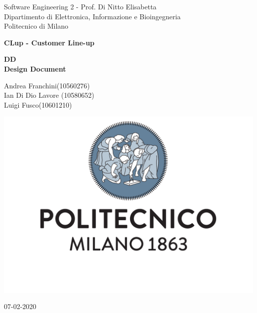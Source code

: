 \documentclass[a4paper]{article}
\begin{document}
\begin{titlepage}
	\centering
    
    {\normalsize 
        Software Engineering 2 - Prof. Di Nitto Elisabetta \\ 
		Dipartimento di Elettronica, Informazione e Bioingegneria \\
        Politecnico di Milano \par
    }     \vspace{3cm}

    {\Huge \textbf{CLup - Customer Line-up\\} }    \vspace{1cm}
  
    {\large \textbf{DD\\Design Document} \par}     \vspace{4cm}

	{\normalsize Andrea Franchini(10560276) \\ Ian Di Dio Lavore (10580652)\\ Luigi Fusco(10601210)\par}     \vspace{3cm}

    \includegraphics[scale=0.4]{images/logo.pdf}
    \vspace{0.5cm}


	{\normalsize 07-02-2020 \par}
	
\end{titlepage}

\tableofcontents

    
    
    
    
    
    
    

    
\end{document}
